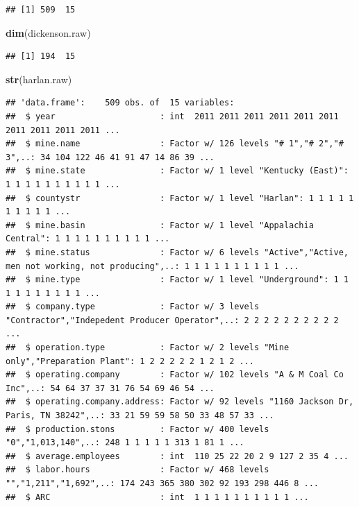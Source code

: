 \documentclass[12pt,]{article}
\newenvironment{Shaded}{\begin{snugshade}}{\end{snugshade}}
\newcommand{\KeywordTok}[1]{\textcolor[rgb]{0.13,0.29,0.53}{\textbf{#1}}}
\newcommand{\NormalTok}[1]{#1}
\begin{document}
\begin{verbatim}
## [1] 509  15
\end{verbatim}

\begin{Shaded}
\begin{Highlighting}[]
\KeywordTok{dim}\NormalTok{(dickenson.raw)}
\end{Highlighting}
\end{Shaded}

\begin{verbatim}
## [1] 194  15
\end{verbatim}

\begin{Shaded}
\begin{Highlighting}[]
\KeywordTok{str}\NormalTok{(harlan.raw)}
\end{Highlighting}
\end{Shaded}

\begin{verbatim}
## 'data.frame':    509 obs. of  15 variables:
##  $ year                     : int  2011 2011 2011 2011 2011 2011 2011 2011 2011 2011 ...
##  $ mine.name                : Factor w/ 126 levels "# 1","# 2","# 3",..: 34 104 122 46 41 91 47 14 86 39 ...
##  $ mine.state               : Factor w/ 1 level "Kentucky (East)": 1 1 1 1 1 1 1 1 1 1 ...
##  $ countystr                : Factor w/ 1 level "Harlan": 1 1 1 1 1 1 1 1 1 1 ...
##  $ mine.basin               : Factor w/ 1 level "Appalachia Central": 1 1 1 1 1 1 1 1 1 1 ...
##  $ mine.status              : Factor w/ 6 levels "Active","Active, men not working, not producing",..: 1 1 1 1 1 1 1 1 1 1 ...
##  $ mine.type                : Factor w/ 1 level "Underground": 1 1 1 1 1 1 1 1 1 1 ...
##  $ company.type             : Factor w/ 3 levels "Contractor","Indepedent Producer Operator",..: 2 2 2 2 2 2 2 2 2 2 ...
##  $ operation.type           : Factor w/ 2 levels "Mine only","Preparation Plant": 1 2 2 2 2 2 1 2 1 2 ...
##  $ operating.company        : Factor w/ 102 levels "A & M Coal Co Inc",..: 54 64 37 37 31 76 54 69 46 54 ...
##  $ operating.company.address: Factor w/ 92 levels "1160 Jackson Dr, Paris, TN 38242",..: 33 21 59 59 58 50 33 48 57 33 ...
##  $ production.stons         : Factor w/ 400 levels "0","1,013,140",..: 248 1 1 1 1 1 313 1 81 1 ...
##  $ average.employees        : int  110 25 22 20 2 9 127 2 35 4 ...
##  $ labor.hours              : Factor w/ 468 levels "","1,211","1,692",..: 174 243 365 380 302 92 193 298 446 8 ...
##  $ ARC                      : int  1 1 1 1 1 1 1 1 1 1 ...
\end{verbatim}
\end{document}
